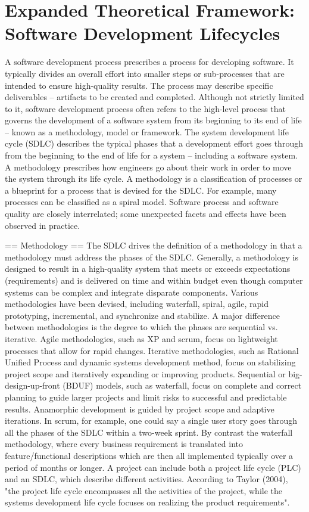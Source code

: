 \section{Expanded Theoretical Framework: Software Development Lifecycles}
A software development process prescribes a process for developing software. It typically divides an overall effort into smaller steps or sub-processes that are intended to ensure high-quality results. The process may describe specific deliverables – artifacts to be created and completed. 
Although not strictly limited to it, software development process often refers to the high-level process that governs the development of a software system from its beginning to its end of life – known as a methodology, model or framework. The system development life cycle (SDLC) describes the typical phases that a development effort goes through from the beginning to the end of life for a system – including a software system. A methodology prescribes how engineers go about their work in order to move the system through its life cycle. A methodology is a classification of processes or a blueprint for a process that is devised for the SDLC. For example, many processes can be classified as a spiral model.
Software process and software quality are closely interrelated; some unexpected facets and effects have been observed in practice.


== Methodology ==
The SDLC drives the definition of a methodology in that a methodology must address the phases of the SDLC. Generally, a methodology is designed to result in a high-quality system that meets or exceeds expectations (requirements) and is delivered on time and within budget even though computer systems can be complex and integrate disparate components. Various methodologies have been devised, including waterfall, spiral, agile, rapid prototyping, incremental, and synchronize and stabilize.
A major difference between methodologies is the degree to which the phases are sequential vs. iterative. Agile methodologies, such as XP and scrum, focus on lightweight processes that allow for rapid changes. Iterative methodologies, such as Rational Unified Process and dynamic systems development method, focus on stabilizing project scope and iteratively expanding or improving products. Sequential or big-design-up-front (BDUF) models, such as waterfall, focus on complete and correct planning to guide larger projects and limit risks to successful and predictable results. Anamorphic development is guided by project scope and adaptive iterations. In scrum, for example, one could say a single user story goes through all the phases of the SDLC within a two-week sprint. By contrast the waterfall methodology, where every business requirement is translated into feature/functional descriptions which are then all implemented typically over a period of months or longer.
A project can include both a project life cycle (PLC) and an SDLC, which describe different activities. According to Taylor (2004), "the project life cycle encompasses all the activities of the project, while the systems development life cycle focuses on realizing the product requirements".


